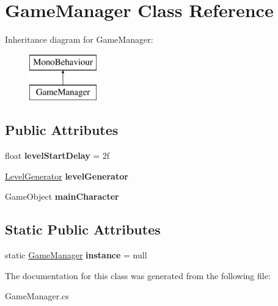 \hypertarget{class_game_manager}{}\section{Game\+Manager Class Reference}
\label{class_game_manager}
Inheritance diagram for Game\+Manager\+:\begin{figure}[H]
\begin{center}
\leavevmode
\includegraphics[height=2.000000cm]{class_game_manager}
\end{center}
\end{figure}
\subsection*{Public Attributes}
\begin{DoxyCompactItemize}
\item 
\mbox{\label{class_game_manager_a2195c4ae8d753a31d968d7c8347668de}} 
float {\bfseries level\+Start\+Delay} = 2f
\item 
\mbox{\label{class_game_manager_a80dd88e2622249f02c752fc84cac3f92}} 
\mbox{\hyperlink{class_completed_1_1_level_generator}{Level\+Generator}} {\bfseries level\+Generator}
\item 
\mbox{\label{class_game_manager_a6b205783f48dd535e8db182d69e55ed7}} 
Game\+Object {\bfseries main\+Character}
\end{DoxyCompactItemize}
\subsection*{Static Public Attributes}
\begin{DoxyCompactItemize}
\item 
\mbox{\label{class_game_manager_a7666e8468dac197b9eb32dd32128524f}} 
static \mbox{\hyperlink{class_game_manager}{Game\+Manager}} {\bfseries instance} = null
\end{DoxyCompactItemize}


The documentation for this class was generated from the following file\+:\begin{DoxyCompactItemize}
\item 
Game\+Manager.\+cs\end{DoxyCompactItemize}
